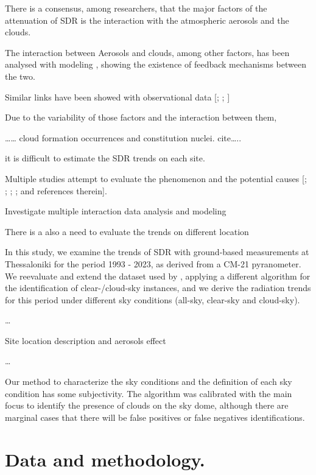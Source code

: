 \documentclass[preprint, 3p,
authoryear]{elsarticle} %
\begin{document}
There is a consensus, among researchers, that the major factors of the
attenuation of SDR is the interaction with the atmospheric aerosols and
the clouds.

The interaction between Aerosols and clouds, among other factors, has
been analysed with modeling \citep{Li2016, Samset2018}, showing the
existence of feedback mechanisms between the two.

Similar links have been showed with observational data
{[}\citet{Ohvril2009}; \citet{Schwarz2020}; {]}

Due to the variability of those factors and the interaction between
them,

\ldots\ldots{} cloud formation occurrences and constitution nuclei.
cite\ldots..

it is difficult to estimate the SDR trends on each site.

Multiple studies attempt to evaluate the phenomenon and the potential
causes {[}; \citet{Wild2012}; \citet{Xia2007}; \citet{Zerefos2009}; and
references therein{]}.

Investigate multiple interaction \citet{Li2016} \citet{Samset2018} data
analysis and modeling

There is a also a need to evaluate the trends on different location

In this study, we examine the trends of SDR with ground-based
measurements at Thessaloniki for the period 1993 - 2023, as derived from
a CM-21 pyranometer. We reevaluate and extend the dataset used by
\citet{Bais2013}, applying a different algorithm for the identification
of clear-/cloud-sky instances, and we derive the radiation trends for
this period under different sky conditions (all-sky, clear-sky and
cloud-sky).

\ldots{}

Site location description and aerosols effect

\ldots{}

Our method to characterize the sky conditions and the definition of each
sky condition has some subjectivity. The algorithm was calibrated with
the main focus to identify the presence of clouds on the sky dome,
although there are marginal cases that there will be false positives or
false negatives identifications.

\hypertarget{data-and-methodology.}{%
\section{Data and methodology.}\label{data-and-methodology.}}
\end{document}
